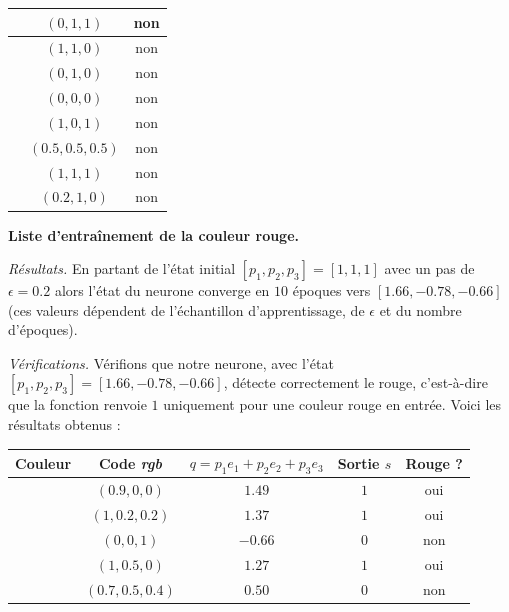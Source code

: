 \documentclass[11pt,class=report,crop=false]{standalone}
\begin{document}
\begin{activite}[Neurone]
\begin{enumerate}
\begin{center}
\begin{tabular}{|c|c|c|}
	\cellcolor{notred1}  & $(0,1,1)$ & non \\ \hline
	\cellcolor{notred2}  & $(1,1,0)$ & non \\ \hline
	\cellcolor{notred3}  & $(0,1,0)$ & non \\ \hline
	\cellcolor{notred4}  & $(0,0,0)$ & non \\ \hline  
	\cellcolor{notred5}  & $(1,0,1)$ & non \\ \hline
	\cellcolor{notred6}  & $(0.5,0.5,0.5)$ & non \\ \hline
	\cellcolor{notred7}  & $(1,1,1)$ & non \\ \hline	
	\cellcolor{notred8}  & $(0.2,1,0)$ & non \\ \hline	
\end{tabular}


{\bf Liste d'entraînement de la couleur rouge.}
\end{center} 

\medskip

	\emph{Résultats.} En partant de l'état initial $[p_1,p_2,p_3]=[1,1,1]$ avec un pas de $\epsilon=0.2$
	alors l'état du neurone converge en $10$ époques vers $[1.66,-0.78,-0.66]$
	(ces valeurs dépendent de l'échantillon d'apprentissage, de $\epsilon$ et du nombre d'époques).
	
	
	
\medskip
	
	\emph{Vérifications.}
	Vérifions que notre neurone, avec l'état $[p_1,p_2,p_3]=[1.66,-0.78,-0.66]$, détecte correctement le rouge, c'est-à-dire que la fonction  renvoie $1$ uniquement pour une couleur rouge en entrée. Voici les résultats obtenus :

	
\begin{center}
	\begin{tabular}{|c|c|c|c|c|}
		\hline
		Couleur &  Code \emph{rgb}  &  $q=p_1 e_1 + p_2e_2+p_3e_3$ & Sortie $s$ & Rouge ?\\ \hline\hline
		
		\cellcolor{isred1}  & $(0.9,0,0)$ & $1.49$ & $1$ & oui \\ \hline
		\cellcolor{isred2}  & $(1,0.2,0.2)$ & $1.37$ & $1$ & oui \\ \hline
		\cellcolor{isred3}  & $(0,0,1)$ & $-0.66$ & $0$ & non \\ \hline
		\cellcolor{isred4}  & $(1,0.5,0)$ & $1.27$ & $1$ & oui \\ \hline  
		\cellcolor{isred5}  & $(0.7,0.5,0.4)$ & $0.50$ & $0$ & non \\ \hline
         

\end{tabular}
\end{center}
\end{enumerate}
\end{activite}
\end{document}
